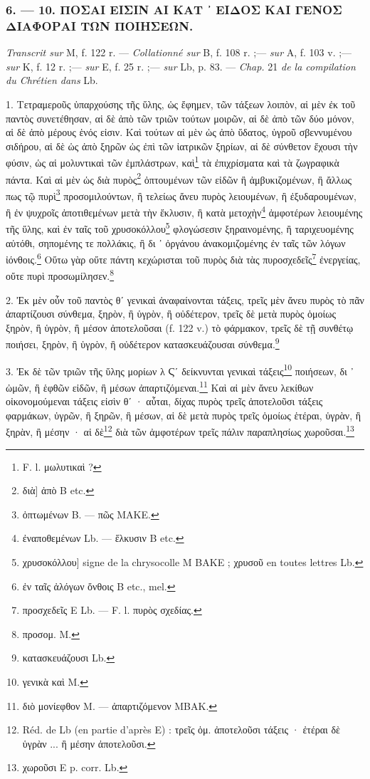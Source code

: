 \documentclass[a4paper, 11pt, oneside, polutonikogreek, french]{article}
\begin{document}
\bigskip
\centerline{\EightStarTaper}
\centerline{\EightStarTaper\EightStarTaper}
\bigskip

\subsubsection{6. --- 10. ΠΟΣΑΙ ΕΙΣΙΝ ΑΙ ΚΑΤ ᾽ ΕΙΔΟΣ ΚΑΙ ΓΕΝΟΣ ΔΙΑΦΟΡΑΙ ΤΩΝ ΠΟΙΗΣΕΩΝ.}

\emph{Transcrit sur} M, f. 122 r. --- \emph{Collationné sur} B, f. 108 r. ;--- \emph{sur} A, f. 103 v. ;--- \emph{sur} K, f. 12 r. ;--- \emph{sur} E, f. 25 r. ;--- \emph{sur} Lb, p. 83. --- \emph{Chap.} 21 \emph{de la compilation du Chrétien dans} Lb.

1. Τετραμεροῦς ὑπαρχούσης τῆς ὕλης, ὡς ἔφημεν, τῶν τάξεων λοιπὸν, αἱ μὲν ἐκ τοῦ παντὸς συνετέθησαν, αἱ δὲ ἀπὸ τῶν τριῶν τούτων μοιρῶν, αἱ δὲ ἀπὸ τῶν δύο μόνον, αἱ δὲ ἀπὸ μέρους ἑνός εἰσιν. Καὶ τούτων αἱ μὲν ὡς ἀπὸ ὕδατος, ὑγροῦ σβεννυμένου σιδήρου, αἱ δὲ ὡς ἀπὸ ξηρῶν ὡς ἐπὶ τῶν ἰατρικῶν ξηρίων, αἱ δὲ σύνθετον ἔχουσι τὴν φύσιν, ὡς αἱ μολυντικαὶ τῶν ἐμπλάστρων, καὶ\footnote{F. l. μωλυτικαὶ ?} τὰ ἐπιχρίσματα καὶ τὰ ζωγραφικὰ πάντα. Καὶ αἱ μὲν ὡς διὰ πυρὸς\footnote{διὰ] ἀπὸ B etc.} ὀπτουμένων τῶν εἰδῶν ἢ ἀμβυκιζομένων, ἢ ἄλλως πως τῷ πυρὶ\footnote{ὀπτωμένων B. --- πῶς MAKE.} προσομιλούντων, ἢ τελείως ἄνευ πυρὸς λειουμένων, ἢ ἐξυδαρουμένων, ἢ ἐν ψυχροῖς ἀποτιθεμένων μετὰ τὴν ἔκλυσιν, ἢ κατὰ μετοχὴν\footnote{ἐναποθεμένων Lb. --- ἕλκυσιν B etc.} ἀμφοτέρων λειουμένης τῆς ὕλης, καὶ ἐν ταῖς τοῦ χρυσοκόλλου\footnote{χρυσοκόλλου] signe de la chrysocolle M BAKE ; χρυσοῦ en toutes lettres Lb.} φλογώσεσιν ξηραινομένης, ἢ ταριχευομένης αὐτόθι, σηπομένης τε πολλάκις, ἢ δι ᾽ ὀργάνου ἀνακομιζομένης ἐν ταῖς τῶν λόγων ἰόνθοις.\footnote{ἐν ταῖς ἀλόγων ὄνθοις B etc., mel.} Οὕτω γὰρ οὔτε πάντη κεχώρισται τοῦ πυρὸς διὰ τὰς πυροσχεδεῖς\footnote{προσχεδεῖς E Lb. --- F. l. πυρὸς σχεδίας.} ἐνεργείας, οὔτε πυρὶ προσωμίλησεν.\footnote{προσομ. M.}

2. Ἐκ μὲν οὖν τοῦ παντὸς θʹ γενικαὶ ἀναφαίνονται τάξεις, τρεῖς μὲν ἄνευ πυρὸς τὸ πᾶν ἀπαρτίζουσι σύνθεμα, ξηρὸν, ἢ ὑγρὸν, ἢ οὐδέτερον, τρεῖς δὲ μετὰ πυρὸς ὁμοίως ξηρὸν, ἢ ὑγρὸν, ἢ μέσον ἀποτελοῦσαι (f. 122 v.) τὸ φάρμακον, τρεῖς δὲ τῇ συνθέτῳ ποιήσει, ξηρὸν, ἢ ὑγρὸν, ἢ οὐδέτερον κατασκευάζουσαι σύνθεμα.\footnote{κατασκευάζουσι Lb.}

3. Ἐκ δὲ τῶν τριῶν τῆς ὕλης μορίων λ Ϛʹ δείκνυνται γενικαὶ τάξεις\footnote{γενικὰ καὶ M.} ποιήσεων, δι ᾽ ὠμῶν, ἢ ἑφθῶν εἰδῶν, ἢ μέσων ἀπαρτιζόμεναι.\footnote{διὸ μονίεφθον M. --- ἀπαρτιζόμενον MBAK.} Καὶ αἱ μὲν ἄνευ λεκίθων οἰκονομούμεναι τάξεις εἰσὶν θʹ · αὗται, δίχας πυρὸς τρεῖς ἀποτελοῦσι τάξεις φαρμάκων, ὑγρῶν, ἢ ξηρῶν, ἢ μέσων, αἱ δὲ μετὰ πυρὸς τρεῖς ὁμοίως ἑτέραι, ὑγρὰν, ἢ ξηρὰν, ἢ μέσην · αἱ δὲ\footnote{Réd. de Lb (en partie d'après E) : τρεῖς ὁμ. ἀποτελοῦσι τάξεις · ἐτέραι δὲ ὑγρὰν ... ἢ μέσην ἀποτελοῦσι.} διὰ τῶν ἀμφοτέρων τρεῖς πάλιν παραπλησίως χωροῦσαι.\footnote{χωροῦσι E p. corr. Lb.}
\end{document}
